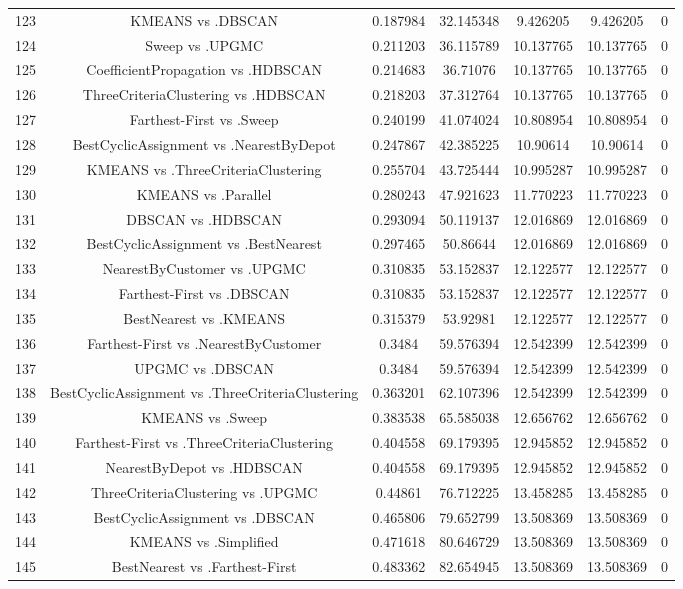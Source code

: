 \documentclass[a4paper,10pt]{article}
\begin{document}
\begin{landscape}
\begin{table}[!htp]
\begin{tabular}{ccccccc}
123&KMEANS vs .DBSCAN&0.187984&32.145348&9.426205&9.426205&0\\
124&Sweep vs .UPGMC&0.211203&36.115789&10.137765&10.137765&0\\
125&CoefficientPropagation vs .HDBSCAN&0.214683&36.71076&10.137765&10.137765&0\\
126&ThreeCriteriaClustering vs .HDBSCAN&0.218203&37.312764&10.137765&10.137765&0\\
127&Farthest-First vs .Sweep&0.240199&41.074024&10.808954&10.808954&0\\
128&BestCyclicAssignment vs .NearestByDepot&0.247867&42.385225&10.90614&10.90614&0\\
129&KMEANS vs .ThreeCriteriaClustering&0.255704&43.725444&10.995287&10.995287&0\\
130&KMEANS vs .Parallel&0.280243&47.921623&11.770223&11.770223&0\\
131&DBSCAN vs .HDBSCAN&0.293094&50.119137&12.016869&12.016869&0\\
132&BestCyclicAssignment vs .BestNearest&0.297465&50.86644&12.016869&12.016869&0\\
133&NearestByCustomer vs .UPGMC&0.310835&53.152837&12.122577&12.122577&0\\
134&Farthest-First vs .DBSCAN&0.310835&53.152837&12.122577&12.122577&0\\
135&BestNearest vs .KMEANS&0.315379&53.92981&12.122577&12.122577&0\\
136&Farthest-First vs .NearestByCustomer&0.3484&59.576394&12.542399&12.542399&0\\
137&UPGMC vs .DBSCAN&0.3484&59.576394&12.542399&12.542399&0\\
138&BestCyclicAssignment vs .ThreeCriteriaClustering&0.363201&62.107396&12.542399&12.542399&0\\
139&KMEANS vs .Sweep&0.383538&65.585038&12.656762&12.656762&0\\
140&Farthest-First vs .ThreeCriteriaClustering&0.404558&69.179395&12.945852&12.945852&0\\
141&NearestByDepot vs .HDBSCAN&0.404558&69.179395&12.945852&12.945852&0\\
142&ThreeCriteriaClustering vs .UPGMC&0.44861&76.712225&13.458285&13.458285&0\\
143&BestCyclicAssignment vs .DBSCAN&0.465806&79.652799&13.508369&13.508369&0\\
144&KMEANS vs .Simplified&0.471618&80.646729&13.508369&13.508369&0\\
145&BestNearest vs .Farthest-First&0.483362&82.654945&13.508369&13.508369&0\\

\end{tabular}
\end{table}
\end{landscape}
\end{document}
